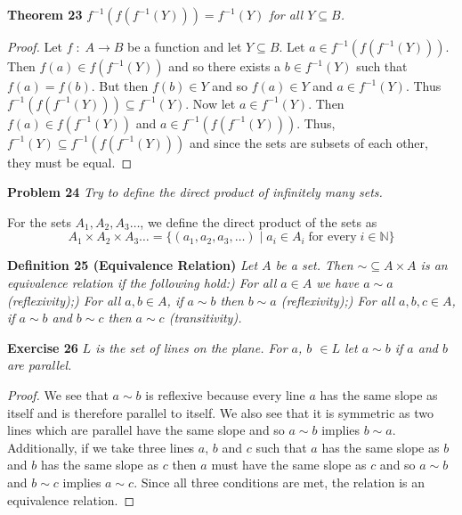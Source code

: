 \documentclass{article}
\begin{document}
\begin{flushleft}
\textbf{Theorem 23}
\textsl{$f^{-1}(f(f^{-1}(Y))) = f^{-1}(Y)$ for all $Y \subseteq B$.}\newline
\begin{proof}
Let $f \; : \; A \rightarrow B$ be a function and let $Y \subseteq B$. Let $a \in f^{-1}(f(f^{-1}(Y)))$. Then $f(a) \in f(f^{-1}(Y))$ and so there exists a $b \in f^{-1}(Y)$ such that $f(a) = f(b)$. But then $f(b) \in Y$ and so $f(a) \in Y$ and $a \in f^{-1}(Y)$. Thus $f^{-1}(f(f^{-1}(Y))) \subseteq f^{-1}(Y)$. Now let $a \in f^{-1}(Y)$. Then $f(a) \in f(f^{-1}(Y))$ and $a \in f^{-1}(f(f^{-1}(Y)))$. Thus, $f^{-1}(Y) \subseteq f^{-1}(f(f^{-1}(Y)))$ and since the sets are subsets of each other, they must be equal.
\end{proof}

\textbf{Problem 24}
\textsl{Try to define the direct product of infinitely many sets.}\newline

For the sets $A_1, A_2, A_3 \dots$, we define the direct product of the sets as
\[
A_1 \times A_2 \times A_3 \dots = \{ (a_1, a_2, a_3, \dots) \mid a_{i} \in A_{i} \; \text{for every} \; i \in \mathbb{N} \}
\]

\textbf{Definition 25 (Equivalence Relation)}
\textsl{Let $A$ be a set. Then $\sim \subseteq A \times A$ is an equivalence relation if the following hold:) For all $a \in A$ we have $a \sim a$ (reflexivity);) For all $a, b \in A$, if $a \sim b$ then $b \sim a$ (reflexivity);) For all $a,b,c \in A$, if $a \sim b$ and $b \sim c$ then $a \sim c$ (transitivity).}\newline

\textbf{Exercise 26}
\textsl{$L$ is the set of lines on the plane. For $a$, $b$ $\in L$ let $a \sim b$ if $a$ and $b$ are parallel.}
\begin{proof}
We see that $a \sim b$ is reflexive because every line $a$ has the same slope as itself and is therefore parallel to itself. We also see that it is symmetric as two lines which are parallel have the same slope and so $a \sim b$ implies $b \sim a$. Additionally, if we take three lines $a$, $b$ and $c$ such that $a$ has the same slope as $b$ and $b$ has the same slope as $c$ then $a$ must have the same slope as $c$ and so $a \sim b$ and $b \sim c$ implies $a \sim c$. Since all three conditions are met, the relation is an equivalence relation.
\end{proof}


\end{flushleft}
\end{document}
